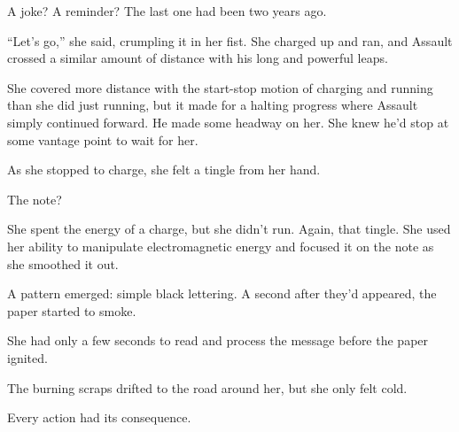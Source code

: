A joke?  A reminder?  The last one had been two years ago.



``Let's go,'' she said, crumpling it in her fist.  She charged up and ran, and Assault crossed a similar amount of distance with his long and powerful leaps.



She covered more distance with the start-stop motion of charging and running than she did just running, but it made for a halting progress where Assault simply continued forward.  He made some headway on her.  She knew he'd stop at some vantage point to wait for her.



As she stopped to charge, she felt a tingle from her hand.



The note?



She spent the energy of a charge, but she didn't run.  Again, that tingle.  She used her ability to manipulate electromagnetic energy and focused it on the note as she smoothed it out.



A pattern emerged: simple black lettering.  A second after they'd appeared, the paper started to smoke.



She had only a few seconds to read and process the message before the paper ignited.





The burning scraps drifted to the road around her, but she only felt cold.



Every action had its consequence.


